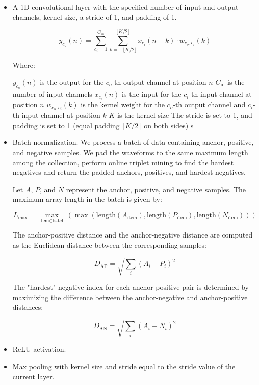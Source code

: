 \begin{itemize}
    \item A 1D convolutional layer with the specified number of input and output channels, kernel size, a stride of 1, and padding of 1.

    \begin{equation}
y_{c_o}(n) = \sum_{c_i=1}^{C_{\text{in}}} \sum_{k=-\lfloor K/2 \rfloor}^{\lfloor K/2 \rfloor} x_{c_i}(n - k) \cdot w_{c_o, c_i}(k)
\end{equation}

Where:

$y_{c_o}(n)$ is the output for the $c_o$-th output channel at position $n$
$C_{\text{in}}$ is the number of input channels
$x_{c_i}(n)$ is the input for the $c_i$-th input channel at position $n$
$w_{c_o, c_i}(k)$ is the kernel weight for the $c_o$-th output channel and $c_i$-th input channel at position $k$
$K$ is the kernel size
The stride is set to 1, and padding is set to 1 (equal padding $\lfloor K/2 \rfloor$ on both sides)
s
    \item Batch normalization. We process a batch of data containing anchor, positive, and negative samples. We pad the waveforms to the same  maximum length among the collection, perform online triplet mining to find the hardest negatives and return the padded anchors, positives, and hardest negatives.

    Let $A$, $P$, and $N$ represent the anchor, positive, and negative samples. The maximum array length in the batch is given by:

    \begin{equation}
L_{\text{max}} = \max_{\text{item} \in \text{batch}}(\max(\text{length}(A_{\text{item}}), \text{length}(P_{\text{item}}), \text{length}(N_{\text{item}})))
\end{equation}

    The anchor-positive distance and the anchor-negative distance are computed as the Euclidean distance between the corresponding samples:

    \begin{equation}
D_{\text{AP}} = \sqrt{\sum_{i} (A_i - P_i)^2}
\end{equation}

    The "hardest" negative index for each anchor-positive pair is determined by maximizing the difference between the anchor-negative and anchor-positive distances:

    \begin{equation}
D_{\text{AN}} = \sqrt{\sum_{i} (A_i - N_i)^2}
\end{equation}

    
    \item ReLU activation. 

    
    \item Max pooling with kernel size and stride equal to the stride value of the current layer.
\end{itemize}

